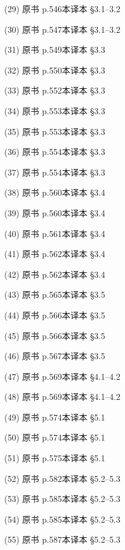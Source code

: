 \begin{termlist}
\item[(29)] 原书 p.546\quad 本译本 §3.1--3.2
\item[(30)] 原书 p.547\quad 本译本 §3.1--3.2
\item[(31)] 原书 p.549\quad 本译本 §3.3
\item[(32)] 原书 p.550\quad 本译本 §3.3
\item[(33)] 原书 p.552\quad 本译本 §3.3
\item[(34)] 原书 p.553\quad 本译本 §3.3
\item[(35)] 原书 p.553\quad 本译本 §3.3
\item[(36)] 原书 p.554\quad 本译本 §3.3
\item[(37)] 原书 p.554\quad 本译本 §3.3
\item[(38)] 原书 p.560\quad 本译本 §3.4
\item[(39)] 原书 p.560\quad 本译本 §3.4
\item[(40)] 原书 p.561\quad 本译本 §3.4
\item[(41)] 原书 p.562\quad 本译本 §3.4
\item[(42)] 原书 p.562\quad 本译本 §3.4
\item[(43)] 原书 p.565\quad 本译本 §3.5
\item[(44)] 原书 p.566\quad 本译本 §3.5
\item[(45)] 原书 p.566\quad 本译本 §3.5
\item[(46)] 原书 p.567\quad 本译本 §3.5
\item[(47)] 原书 p.569\quad 本译本 §4.1--4.2
\item[(48)] 原书 p.569\quad 本译本 §4.1--4.2
\item[(49)] 原书 p.574\quad 本译本 §5.1
\item[(50)] 原书 p.574\quad 本译本 §5.1
\item[(51)] 原书 p.575\quad 本译本 §5.1
\item[(52)] 原书 p.582\quad 本译本 §5.2--5.3
\item[(53)] 原书 p.585\quad 本译本 §5.2--5.3
\item[(54)] 原书 p.585\quad 本译本 §5.2--5.3
\item[(55)] 原书 p.587\quad 本译本 §5.2--5.3
\end{termlist}
